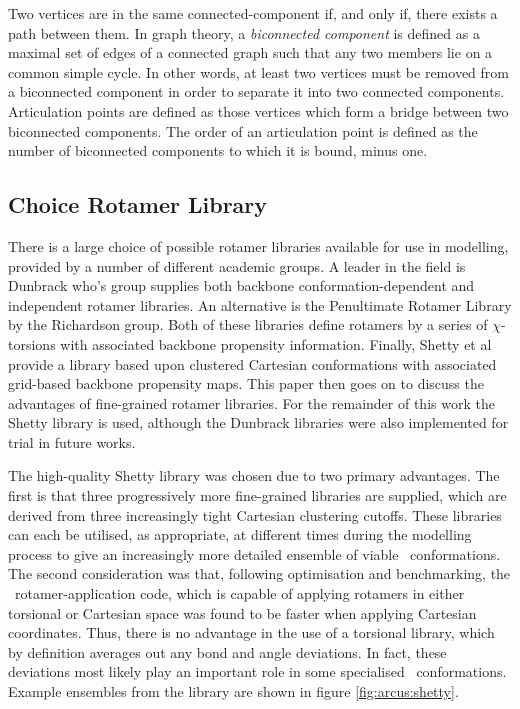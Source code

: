 Two vertices are in the same connected-component if, and only if, there exists a path between them. In graph theory, a \emph{biconnected component}  is defined as a maximal set of edges of a connected graph such that any two members lie on a common simple cycle.
In other words, at least two vertices must be removed from a biconnected component in order to separate
it into two connected components.
Articulation points are defined as those vertices which form a bridge between two biconnected components. The order of an articulation point is defined as the number of biconnected components to which it is bound, minus one. 



\subsection{Choice Rotamer Library}

There is a large choice of possible rotamer libraries available for use in modelling, provided by a number of different academic groups.
A leader in the field is Dunbrack who's group supplies both backbone conformation-dependent and independent rotamer libraries\cite{NATIVE:Dunbrack2002}. An alternative is the Penultimate Rotamer Library by the Richardson group\cite{COMPCHEM:RICHARDSON}.
Both of these libraries  define rotamers by a series of $\chi$-torsions with associated backbone propensity information. Finally, Shetty et al provide a library based upon clustered Cartesian conformations with associated grid-based backbone propensity maps\cite{NATIVE:Shetty2003}. This paper then goes on to discuss the advantages of fine-grained rotamer libraries. For the remainder of this work the Shetty library is used, although the Dunbrack libraries were also implemented for trial in future works. 

The high-quality Shetty library was chosen due to two primary advantages. The first is that three progressively more fine-grained libraries are supplied, which are derived from three increasingly tight Cartesian clustering cutoffs. These libraries can each be utilised, as appropriate, at different times during the modelling process to give an increasingly more detailed ensemble of viable \sidechain\ conformations. The second consideration was that, following optimisation and benchmarking, the \pd\ rotamer-application code, which is capable of applying rotamers in either torsional or Cartesian space was found to be faster when applying Cartesian coordinates. Thus, there is no advantage in the use of a torsional library, which by definition averages out any bond and angle deviations.  In fact, these deviations most likely play an important role in some specialised \sidechain\ conformations. Example ensembles from the library are shown in figure \ref{fig:arcus:shetty}.

